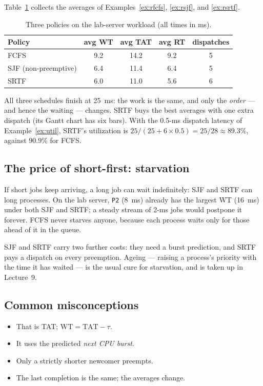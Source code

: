 \documentclass[11pt]{article}
\begin{document}
Table~\ref{tab:compare} collects the averages of
Examples~\ref{ex:rfcfs}, \ref{ex:rsjf}, and \ref{ex:rsrtf}.

\begin{table}[h]
\centering
\renewcommand{\arraystretch}{1.2}
\begin{tabular}{lcccc}
  \toprule
  \textbf{Policy} & \textbf{avg WT} & \textbf{avg TAT} & \textbf{avg RT} & \textbf{dispatches} \\
  \midrule
  FCFS & 9.2 & 14.2 & 9.2 & 5 \\
  SJF (non-preemptive) & 6.4 & 11.4 & 6.4 & 5 \\
  SRTF & 6.0 & 11.0 & 5.6 & 6 \\
  \bottomrule
\end{tabular}
\caption{Three policies on the lab-server workload (all times in ms).}
\label{tab:compare}
\end{table}

All three schedules finish at 25~ms: the work is the same, and only the
\emph{order} --- and hence the waiting --- changes. SRTF buys the best averages
with one extra dispatch (its Gantt chart has six bars). With the 0.5-ms dispatch
latency of Example~\ref{ex:util}, SRTF's utilization is
$25/(25 + 6 \times 0.5) = 25/28 \approx 89.3\%$, against $90.9\%$ for FCFS.

\subsection*{The price of short-first: starvation}

If short jobs keep arriving, a long job can wait indefinitely: SJF and SRTF can
 long processes. On the lab server, \texttt{P2} (8~ms) already has
the largest WT (16~ms) under both SJF and SRTF; a steady stream of 2-ms jobs
would postpone it forever. FCFS never starves anyone, because each process waits
only for those ahead of it in the queue.

SJF and SRTF carry two further costs: they need a burst prediction, and SRTF
pays a dispatch on every preemption. Ageing --- raising a process's priority
with the time it has waited --- is the usual cure for starvation, and is taken
up in Lecture~9.

\subsection*{Common misconceptions}

\begin{itemize}
  \item {} That is TAT;
        $\mathrm{WT} = \mathrm{TAT} - \tau$.
  \item {} It uses the predicted
        \emph{next CPU burst}.
  \item {} Only a strictly shorter
        newcomer preempts.
  \item {} The last
        completion is the same; the averages change.
\end{itemize}
\end{document}
